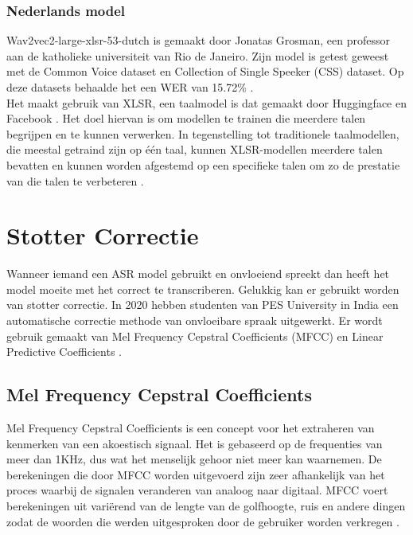 \subsubsection{Nederlands model}
Wav2vec2-large-xlsr-53-dutch is gemaakt door Jonatas Grosman, een professor aan de katholieke universiteit van Rio de Janeiro. Zijn model is getest geweest met de Common Voice dataset en Collection of Single Speeker (CSS) dataset. Op deze datasets behaalde het een WER van 15.72\% \autocite{grosman2021xlsr53-large-dutch}.\\
Het maakt gebruik van XLSR, een taalmodel is dat gemaakt door Huggingface en Facebook \autocite{2022}. Het doel hiervan is om modellen te trainen die meerdere talen begrijpen en te kunnen verwerken. In tegenstelling tot traditionele taalmodellen, die meestal getraind zijn op één taal, kunnen XLSR-modellen meerdere talen bevatten en kunnen worden afgestemd op een specifieke talen om zo de prestatie van die talen te verbeteren \autocite{2021}.

\section{Stotter Correctie}
Wanneer iemand een ASR model gebruikt en onvloeiend spreekt dan heeft het model moeite met het correct te transcriberen. Gelukkig kan er gebruikt worden van stotter correctie. In 2020 hebben studenten van PES University in India een automatische correctie methode van onvloeibare spraak uitgewerkt. Er wordt gebruik gemaakt van Mel Frequency Cepstral Coefficients (MFCC) en Linear Predictive Coefficients \autocite{KN2020}.

\subsection{Mel Frequency Cepstral Coefficients}
Mel Frequency Cepstral Coefficients is een concept voor het extraheren van kenmerken van een akoestisch signaal. Het is gebaseerd op de frequenties van meer dan 1KHz, dus wat het menselijk gehoor niet meer kan waarnemen. De berekeningen die door MFCC worden uitgevoerd zijn zeer afhankelijk van het proces waarbij de signalen veranderen van analoog naar digitaal. MFCC voert berekeningen uit variërend van de lengte van de golfhoogte, ruis en andere dingen zodat de woorden die werden uitgesproken door de gebruiker worden verkregen \autocite{haq2020speech}.

